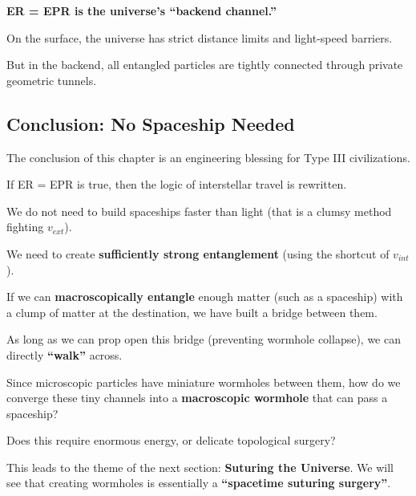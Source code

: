 \textbf{ER = EPR is the universe's ``backend channel.''}

On the surface, the universe has strict distance limits and light-speed barriers.

But in the backend, all entangled particles are tightly connected through private geometric tunnels.

\subsection{Conclusion: No Spaceship Needed}

The conclusion of this chapter is an engineering blessing for Type III civilizations.

If ER = EPR is true, then the logic of interstellar travel is rewritten.

We do not need to build spaceships faster than light (that is a clumsy method fighting $v_{ext}$).

We need to create \textbf{sufficiently strong entanglement} (using the shortcut of $v_{int}$).

If we can \textbf{macroscopically entangle} enough matter (such as a spaceship) with a clump of matter at the destination, we have built a bridge between them.

As long as we can prop open this bridge (preventing wormhole collapse), we can directly \textbf{``walk''} across.

Since microscopic particles have miniature wormholes between them, how do we converge these tiny channels into a \textbf{macroscopic wormhole} that can pass a spaceship?

Does this require enormous energy, or delicate topological surgery?

This leads to the theme of the next section: \textbf{Suturing the Universe}. We will see that creating wormholes is essentially a \textbf{``spacetime suturing surgery''}.

